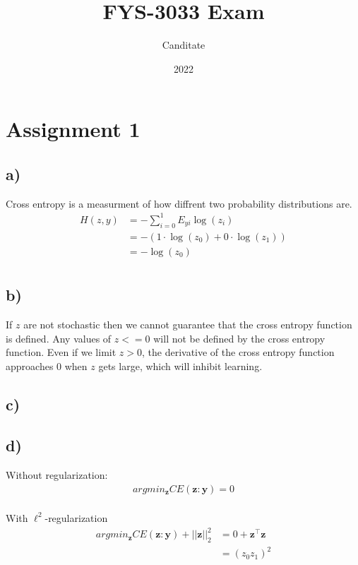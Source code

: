 \documentclass{article}
\title{FYS-3033 Exam}
\author{Canditate}
\date{2022}
\begin{document}
\maketitle
\section{Assignment 1}
\subsection*{a)}
Cross entropy is a measurment of how diffrent two probability distributions are.
\begin{equation}
    \begin{split}
        H(z,y) &= -\sum_{i=0}^1 E_{yi}\log(z_i)\\
        &= -\left(1\cdot\log(z_0)+0\cdot\log(z_1)\right)\\
        &= -\log(z_0)\\    
    \end{split}
\end{equation}

\subsection*{b)}
If $z$ are not stochastic then we cannot guarantee that the cross entropy function is defined. Any values of $z <= 0$ will not be defined by the cross entropy function. Even if we limit $z > 0$, the derivative of the cross entropy function approaches $0$ when $z$ gets large, which will inhibit learning.

\subsection*{c)}
\subsection*{d)}

Without regularization:
\begin{equation}
    \begin{split}
        argmin_\mathbf{z} CE(\mathbf{z}: \mathbf{y}) = 0\\
    \end{split}
\end{equation}

With $\ell^2$-regularization
\begin{equation}
    \begin{split}
        argmin_\mathbf{z} CE(\mathbf{z}: \mathbf{y}) + ||\mathbf{z}||^2_2 &= 0 + \mathbf{z}^\top\mathbf{z}\\
                                                                          &= (z_0z_1)^2
    \end{split}
\end{equation}
\end{document}
